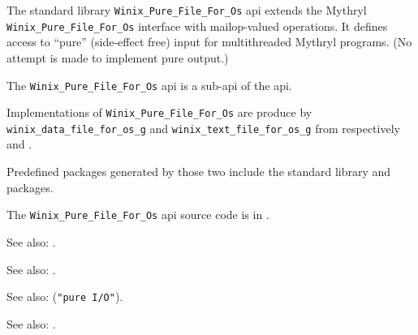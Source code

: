 
The standard library {\tt Winix\_Pure\_File\_For\_Os} api extends the Mythryl {\tt Winix\_Pure\_File\_For\_Os} interface with mailop-valued operations.
It defines access to ``pure'' (side-effect free) input for multithreaded Mythryl programs. 
(No attempt is made to implement pure output.)

The {\tt Winix\_Pure\_File\_For\_Os} api is a sub-api of the  api.

Implementations of {\tt Winix\_Pure\_File\_For\_Os} are produce by 
{\tt winix\_data\_file\_for\_os\_g} and {\tt winix\_text\_file\_for\_os\_g} from respectively 
 and 
.

Predefined packages generated by those two include the standard library  and 
 packages.

The {\tt Winix\_Pure\_File\_For\_Os} api source code is in .

See also: .

See also: .

See also:  ({\tt "pure I/O"}).

See also: .
